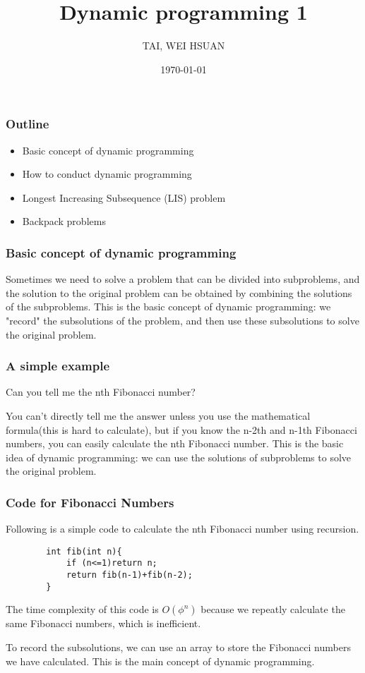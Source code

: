 \documentclass[xcolor=dvipsnames]{beamer}
\title{Dynamic programming 1}
\author{TAI, WEI HSUAN}
\date{\today}
\begin{document}
	
	\begin{frame}
		\titlepage
	\end{frame}
	
	\begin{frame}
		\frametitle{Outline}
        \begin{itemize}
            \item Basic concept of dynamic programming
            \item How to conduct dynamic programming
            \item Longest Increasing Subsequence (LIS) problem
            \item Backpack problems
            
        \end{itemize}
	\end{frame}


    \begin{frame}[fragile]
        \frametitle{Basic concept of dynamic programming}
        Sometimes we need to solve a problem that can be divided into subproblems,
        and the solution to the original problem can be obtained by combining the solutions of the subproblems.
        This is the basic concept of dynamic programming: we "record" the subsolutions of the problem,
        and then use these subsolutions to solve the original problem.
    \end{frame}

    \begin{frame}
        \frametitle{A simple example}
        Can you tell me the nth Fibonacci number?

        You can't directly tell me the answer unless you use the mathematical formula(this is hard to calculate), 
        but if you know the n-2th and n-1th Fibonacci numbers, you can easily calculate the nth Fibonacci number.
        This is the basic idea of dynamic programming: we can use the solutions of subproblems
        to solve the original problem.
    \end{frame}

    \begin{frame}[fragile]
        \frametitle{Code for Fibonacci Numbers}
        Following is a simple code to calculate the nth Fibonacci number using recursion.
        \begin{verbatim}
        int fib(int n){
            if (n<=1)return n;
            return fib(n-1)+fib(n-2);
        }
        \end{verbatim}
        The time complexity of this code is $O(\phi^n)$ because we repeatly calculate the same Fibonacci numbers, which is inefficient.

        To record the subsolutions, we can use an array to store the Fibonacci numbers we have calculated.
        This is the main concept of dynamic programming.
    \end{frame}
\end{document}
